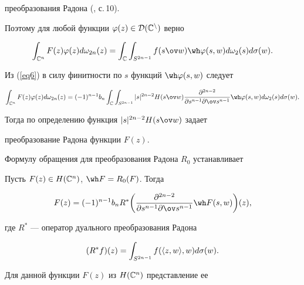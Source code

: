 преобразования Радона (\cite{Sek}, с.\,10). 


Поэтому для любой функции $\varphi(z)\in \cal D(\Bbb C^n)$ верно 


$$


\int_{\Bbb C^n}F(z)\varphi (z)d\omega _{2n}(z)=\int_{\Bbb C}


\int_{S^{2n-1}}f(s\ov w)\wh \varphi (s,w)d\omega _2(s)d\sigma (w).


$$


Из (\ref{eq6}) в силу финитности по $s$ функций $\wh \varphi (s,w)$ следует


$$


\int_{\Bbb C^n}F(z)\varphi (z)d\omega _{2n}(z)=


(-1)^{n-1}b_n\int_{\Bbb C}\int_{S^{2n-1}}


|s|^{2n-2} H(s\ov w)\frac{\partial ^{2n-2}}


{\partial s^{n-1}\partial \ov s^{n-1}}


\wh \varphi (s,w)d\omega _2(s)d\sigma (w).


$$


Тогда по определению функция $|s|^{2n-2} H(s\ov w)$ задает 


преобразование Радона функции $F(z)$.





Формулу обращения для преобразования Радона $R_0$ устанавливает








\begin{thm}


Пусть $F(z) \in H(\Bbb C^n)$, $\wh F=R_0(F)$. Тогда 


$$


F(z)=(-1)^{n-1}b_nR^*\bigg( \frac{\partial^{2n-2}}{\partial s^{n-1}


\partial \ov s^{n-1}}\wh F(s,w)\bigg)(z),


$$


где $R^*$ --- оператор дуального преобразования Радона


$$


(R^*f)(z)=\int_{S^{2n-1}}f(\la z,w\ra ,w)d\sigma (w).


$$


\end{thm}





Для данной функции $F(z)$ из $H(\Bbb C^n)$ представление ее 


